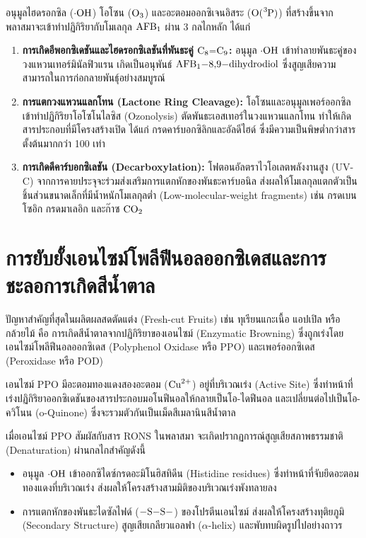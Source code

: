 อนุมูลไฮดรอกซิล ($\cdot\ce{OH}$) โอโซน ($\ce{O3}$) และอะตอมออกซิเจนอิสระ ($\ce{O(^3P)}$) ที่สร้างขึ้นจากพลาสมาจะเข้าทำปฏิกิริยากับโมเลกุล $\ce{AFB1}$ ผ่าน 3 กลไกหลัก ได้แก่

\begin{enumerate}
    \item \textbf{การเกิดอีพอกซิเดชันและไฮดรอกซิเลชันที่พันธะคู่ $\ce{C8=C9}$:} อนุมูล $\cdot\ce{OH}$ เข้าทำลายพันธะคู่ของวงแหวนเทอร์มินัลฟิวแรน เกิดเป็นอนุพันธ์ $\ce{AFB1-8,9-dihydrodiol}$ ซึ่งสูญเสียความสามารถในการก่อกลายพันธุ์อย่างสมบูรณ์
    
    \item \textbf{การแตกวงแหวนแลกโทน (Lactone Ring Cleavage):} โอโซนและอนุมูลเพอร์ออกซิลเข้าทำปฏิกิริยาโอโซโนไลซิส (Ozonolysis) ตัดพันธะเอสเทอร์ในวงแหวนแลกโทน ทำให้เกิดสารประกอบที่มีโครงสร้างเปิด ได้แก่ กรดคาร์บอกซิลิกและอัลดีไฮด์ ซึ่งมีความเป็นพิษต่ำกว่าสารตั้งต้นมากกว่า 100 เท่า
    
    \item \textbf{การเกิดดีคาร์บอกซิเลชัน (Decarboxylation):} โฟตอนอัลตราไวโอเลตพลังงานสูง (UV-C) จากการคายประจุจะร่วมส่งเสริมการแตกหักของพันธะคาร์บอนิล ส่งผลให้โมเลกุลแตกตัวเป็นชิ้นส่วนขนาดเล็กที่มีน้ำหนักโมเลกุลต่ำ (Low-molecular-weight fragments) เช่น กรดเบนโซอิก กรดมาเลอิก และก๊าซ $\ce{CO2}$
\end{enumerate}

\section{การยับยั้งเอนไซม์โพลีฟีนอลออกซิเดสและการชะลอการเกิดสีน้ำตาล}

ปัญหาสำคัญที่สุดในผลิตผลสดตัดแต่ง (Fresh-cut Fruits) เช่น ทุเรียนแกะเนื้อ แอปเปิล หรือกล้วยไม้ คือ การเกิดสีน้ำตาลจากปฏิกิริยาของเอนไซม์ (Enzymatic Browning) ซึ่งถูกเร่งโดยเอนไซม์โพลีฟีนอลออกซิเดส (Polyphenol Oxidase หรือ PPO) และเพอร์ออกซิเดส (Peroxidase หรือ POD)

เอนไซม์ PPO มีอะตอมทองแดงสองอะตอม ($\ce{Cu^2+}$) อยู่ที่บริเวณเร่ง (Active Site) ซึ่งทำหน้าที่เร่งปฏิกิริยาออกซิเดชันของสารประกอบมอโนฟีนอลให้กลายเป็นโอ-ไดฟีนอล และเปลี่ยนต่อไปเป็นโอ-ควิโนน (o-Quinone) ซึ่งจะรวมตัวกันเป็นเม็ดสีเมลานินสีน้ำตาล

เมื่อเอนไซม์ PPO สัมผัสกับสาร RONS ในพลาสมา จะเกิดปรากฏการณ์สูญเสียสภาพธรรมชาติ (Denaturation) ผ่านกลไกสำคัญดังนี้
\begin{itemize}
    \item อนุมูล $\cdot\ce{OH}$ เข้าออกซิไดซ์กรดอะมิโนฮิสทิดีน (Histidine residues) ซึ่งทำหน้าที่จับยึดอะตอมทองแดงที่บริเวณเร่ง ส่งผลให้โครงสร้างสามมิติของบริเวณเร่งพังทลายลง
    \item การแตกหักของพันธะไดซัลไฟด์ ($-\ce{S-S}-$) ของโปรตีนเอนไซม์ ส่งผลให้โครงสร้างทุติยภูมิ (Secondary Structure) สูญเสียเกลียวแอลฟา ($\alpha$-helix) และพับทบผิดรูปไปอย่างถาวร
\end{itemize}

